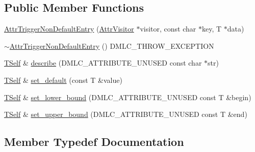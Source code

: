 \subsection*{Public Member Functions}
\begin{DoxyCompactItemize}
\item 
\hyperlink{structtvm_1_1detail_1_1AttrTriggerNonDefaultEntry_a572356cfd8d20c258b03f7a5c62d3909}{Attr\+Trigger\+Non\+Default\+Entry} (\hyperlink{classtvm_1_1AttrVisitor}{Attr\+Visitor} $\ast$visitor, const char $\ast$key, T $\ast$data)
\item 
\hyperlink{structtvm_1_1detail_1_1AttrTriggerNonDefaultEntry_ae3ca1012c8502b2d3132cc81530c6c0e}{$\sim$\+Attr\+Trigger\+Non\+Default\+Entry} () D\+M\+L\+C\+\_\+\+T\+H\+R\+O\+W\+\_\+\+E\+X\+C\+E\+P\+T\+I\+ON
\item 
\hyperlink{structtvm_1_1detail_1_1AttrTriggerNonDefaultEntry_ac7176780304bdf87b523bcae079e17ee}{T\+Self} \& \hyperlink{structtvm_1_1detail_1_1AttrTriggerNonDefaultEntry_aa9eac8ca63d91dab631e14547ec4ce00}{describe} (D\+M\+L\+C\+\_\+\+A\+T\+T\+R\+I\+B\+U\+T\+E\+\_\+\+U\+N\+U\+S\+ED const char $\ast$str)
\item 
\hyperlink{structtvm_1_1detail_1_1AttrTriggerNonDefaultEntry_ac7176780304bdf87b523bcae079e17ee}{T\+Self} \& \hyperlink{structtvm_1_1detail_1_1AttrTriggerNonDefaultEntry_ae88a65b8d90a7c55fc6ea6bb1863b425}{set\+\_\+default} (const T \&value)
\item 
\hyperlink{structtvm_1_1detail_1_1AttrTriggerNonDefaultEntry_ac7176780304bdf87b523bcae079e17ee}{T\+Self} \& \hyperlink{structtvm_1_1detail_1_1AttrTriggerNonDefaultEntry_a8cbd96cebaceae86c9c7613de9cc43dd}{set\+\_\+lower\+\_\+bound} (D\+M\+L\+C\+\_\+\+A\+T\+T\+R\+I\+B\+U\+T\+E\+\_\+\+U\+N\+U\+S\+ED const T \&begin)
\item 
\hyperlink{structtvm_1_1detail_1_1AttrTriggerNonDefaultEntry_ac7176780304bdf87b523bcae079e17ee}{T\+Self} \& \hyperlink{structtvm_1_1detail_1_1AttrTriggerNonDefaultEntry_a9d4c6a36abe06ee7e5edde567ae45f41}{set\+\_\+upper\+\_\+bound} (D\+M\+L\+C\+\_\+\+A\+T\+T\+R\+I\+B\+U\+T\+E\+\_\+\+U\+N\+U\+S\+ED const T \&end)
\end{DoxyCompactItemize}


\subsection{Member Typedef Documentation}
